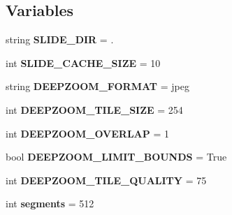 \subsection*{Variables}
\begin{DoxyCompactItemize}
\item 
\mbox{\label{namespacedeepzoom__multiserver_a74adf2670931f0a03970bf84c057fd0e}} 
string {\bfseries S\+L\+I\+D\+E\+\_\+\+D\+IR} = \textquotesingle{}.\textquotesingle{}
\item 
\mbox{\label{namespacedeepzoom__multiserver_a4888ba276e40710b363affa731195bdc}} 
int {\bfseries S\+L\+I\+D\+E\+\_\+\+C\+A\+C\+H\+E\+\_\+\+S\+I\+ZE} = 10
\item 
\mbox{\label{namespacedeepzoom__multiserver_a00315ab99f2dba25ebd95205bebbeed8}} 
string {\bfseries D\+E\+E\+P\+Z\+O\+O\+M\+\_\+\+F\+O\+R\+M\+AT} = \textquotesingle{}jpeg\textquotesingle{}
\item 
\mbox{\label{namespacedeepzoom__multiserver_a7fe9ebbc3034f9c461475e4e7adcfa98}} 
int {\bfseries D\+E\+E\+P\+Z\+O\+O\+M\+\_\+\+T\+I\+L\+E\+\_\+\+S\+I\+ZE} = 254
\item 
\mbox{\label{namespacedeepzoom__multiserver_a3335bccbd25056502d5e18d51e748cf9}} 
int {\bfseries D\+E\+E\+P\+Z\+O\+O\+M\+\_\+\+O\+V\+E\+R\+L\+AP} = 1
\item 
\mbox{\label{namespacedeepzoom__multiserver_abb04e080fe8a53cbd10674b8bb3112d5}} 
bool {\bfseries D\+E\+E\+P\+Z\+O\+O\+M\+\_\+\+L\+I\+M\+I\+T\+\_\+\+B\+O\+U\+N\+DS} = True
\item 
\mbox{\label{namespacedeepzoom__multiserver_a232bd2aa29e9475537179ddb21711af0}} 
int {\bfseries D\+E\+E\+P\+Z\+O\+O\+M\+\_\+\+T\+I\+L\+E\+\_\+\+Q\+U\+A\+L\+I\+TY} = 75
\item 
\mbox{\label{namespacedeepzoom__multiserver_ad72f660e7c98acad572ef71d3720fcb4}} 
int {\bfseries segments} = 512
\item 
\mbox{\label{namespacedeepzoom__multiserver_aee75607cb55cc996d65269b77ad8bbe1}} 

\end{DoxyCompactItemize}
